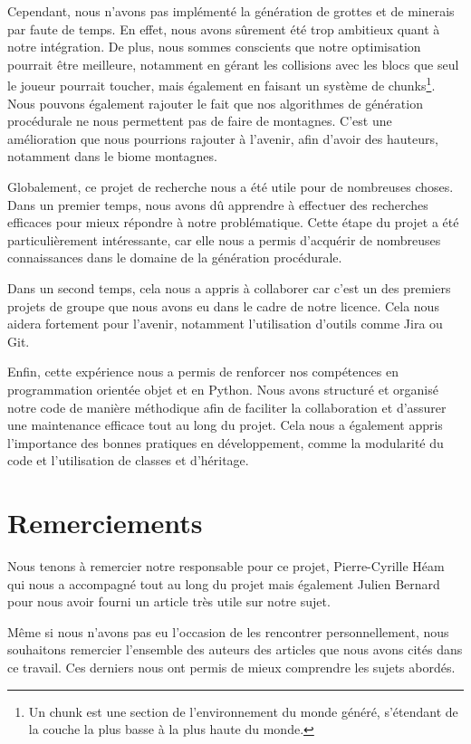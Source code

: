 \documentclass[12pt]{article}
\begin{document}
Cependant, nous n'avons pas implémenté la génération de grottes et de minerais par faute de temps. En effet, nous avons sûrement été trop ambitieux quant à notre intégration. De plus, nous sommes conscients que notre optimisation pourrait être meilleure, notamment en gérant les collisions avec les blocs que seul le joueur pourrait toucher, mais également en faisant un système de chunks\footnote{Un chunk est une section de l’environnement du monde généré, s’étendant de la couche la plus basse à la plus haute du monde.}. Nous pouvons également rajouter le fait que nos algorithmes de génération procédurale ne nous permettent pas de faire de montagnes. C'est une amélioration que nous pourrions rajouter à l'avenir, afin d'avoir des hauteurs, notamment dans le biome montagnes.

Globalement, ce projet de recherche nous a été utile pour de nombreuses choses. Dans un premier temps, nous avons dû apprendre à effectuer des recherches efficaces pour mieux répondre à notre problématique. Cette étape du projet a été particulièrement intéressante, car elle nous a permis d’acquérir de nombreuses connaissances dans le domaine de la génération procédurale.\par
Dans un second temps, cela nous a appris à collaborer car c'est un des premiers projets de groupe que nous avons eu dans le cadre de notre licence. Cela nous aidera fortement pour l'avenir, notamment l'utilisation d'outils comme Jira ou Git.\par
Enfin, cette expérience nous a permis de renforcer nos compétences en programmation orientée objet et en Python. Nous avons structuré et organisé notre code de manière méthodique afin de faciliter la collaboration et d’assurer une maintenance efficace tout au long du projet. Cela nous a également appris l’importance des bonnes pratiques en développement, comme la modularité du code et l’utilisation de classes et d’héritage.
\newpage
{}
\section{Remerciements}
Nous tenons à remercier notre responsable pour ce projet, Pierre-Cyrille Héam qui nous a accompagné tout au long du projet mais également Julien Bernard pour nous avoir fourni un article très utile sur notre sujet.\par
Même si nous n’avons pas eu l’occasion de les rencontrer personnellement, nous souhaitons remercier l’ensemble des auteurs des articles que nous avons cités dans ce travail. Ces derniers nous ont permis de mieux comprendre les sujets abordés.
\end{document}
